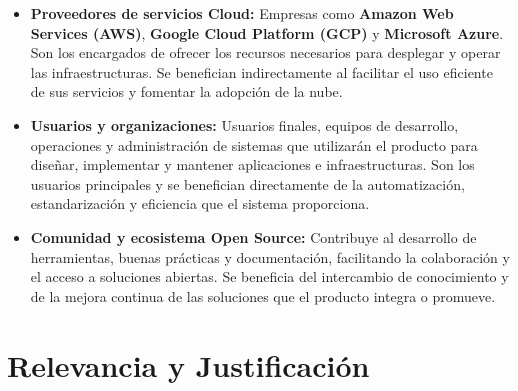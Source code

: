 \documentclass{article}
\begin{document}
{        \begin{itemize}
            \item \textbf{Proveedores de servicios Cloud:} Empresas como \textbf{Amazon Web Services (AWS)}, \textbf{Google Cloud Platform (GCP)} y \textbf{Microsoft Azure}. Son los encargados de ofrecer los recursos necesarios para desplegar y operar las infraestructuras. Se benefician indirectamente al facilitar el uso eficiente de sus servicios y fomentar la adopción de la nube.
        
            \item \textbf{Usuarios y organizaciones:} Usuarios finales, equipos de desarrollo, operaciones y administración de sistemas que utilizarán el producto para diseñar, implementar y mantener aplicaciones e infraestructuras. Son los usuarios principales y se benefician directamente de la automatización, estandarización y eficiencia que el sistema proporciona.
        
            \item \textbf{Comunidad y ecosistema Open Source:} Contribuye al desarrollo de herramientas, buenas prácticas y documentación, facilitando la colaboración y el acceso a soluciones abiertas. Se beneficia del intercambio de conocimiento y de la mejora continua de las soluciones que el producto integra o promueve.
        \end{itemize}
        
       
    }

    \newpage
    \section{Relevancia y Justificación}
\end{document}

